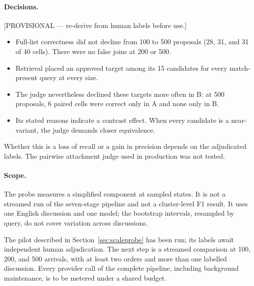 \paragraph{Decisions.} [PROVISIONAL --- re-derive from human labels before use.]
\begin{itemize}
  \item Full-list correctness did not decline from 100 to 500 proposals (28, 31,
    and 31 of 40 cells). There were no false joins at 200 or 500.
  \item Retrieval placed an approved target among its 15 candidates for every
    match-present query at every size.
  \item The judge nevertheless declined these targets more often in B: at 500
    proposals, 6 paired cells were correct only in A and none only in B.
  \item Its stated reasons indicate a contrast effect. When every candidate is a
    near-variant, the judge demands closer equivalence.
\end{itemize}
Whether this is a loss of recall or a gain in precision depends on the adjudicated
labels. The pairwise attachment judge used in production was not tested.

\paragraph{Scope.} The probe measures a simplified component at sampled
states. It is not a streamed run of the seven-stage pipeline and not a
cluster-level F1 result. It uses one English discussion and one model; the
bootstrap intervals, resampled by query, do not cover variation across discussions.

The pilot described in Section~\ref{sec:scaleprobe} has been run; its labels
await independent human adjudication. The next step is a streamed comparison at
100, 200, and 500 arrivals, with at least two orders and more than one
labelled discussion. Every provider call of the complete pipeline, including
background maintenance, is to be metered under a shared budget.
